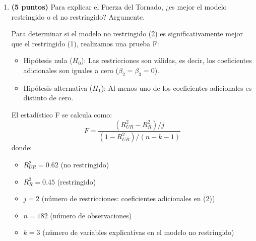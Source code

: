\documentclass[10pt,a4paper]{article}
\begin{document}
\begin{enumerate}
\begin{enumerate}
{    \begin{itemize}
        \item La hipótesis nula (\( H_0 \)) plantea que todos los coeficientes son simultáneamente cero:
        \[
        H_0: \beta_1 = \beta_2 = \beta_3 = 0
        \]
        \item La hipótesis alternativa (\( H_1 \)) es que al menos uno de los coeficientes es distinto de cero.
    \end{itemize}

    El estadístico F del modelo (2) es:
    \[
    F = 96.3, \quad df = (3, 178)
    \]
    El valor crítico de F con \(\alpha=0.01\) y \(df=(3,178)\) es aproximadamente \(3.87\).

    Dado que \( F = 96.3 \) es mucho mayor que el valor crítico, rechazamos la hipótesis nula \( H_0 \) al 1\% de significancia.

    Entonces, el modelo es estadísticamente significativo en su conjunto, lo que indica que al menos una de las variables (\textit{Velocidad del Viento}, \textit{Precipitaciones} o \textit{Temperatura}) tiene un efecto significativo sobre la fuerza del tornado.}

    \item \textbf{(5 puntos)} Para explicar el Fuerza del Tornado, ¿es mejor el modelo restringido o el no restringido? Argumente.\\
{\color{blue}
    Para determinar si el modelo no restringido (2) es significativamente mejor que el restringido (1), realizamos una prueba F:

    \begin{itemize}
        \item Hipótesis nula (\( H_0 \)): Las restricciones son válidas, es decir, los coeficientes adicionales son iguales a cero (\( \beta_2 = \beta_3 = 0 \)).
        \item Hipótesis alternativa (\( H_1 \)): Al menos uno de los coeficientes adicionales es distinto de cero.
    \end{itemize}
    
    El estadístico F se calcula como:
    \[
    F = \frac{(R^2_{UR} - R^2_{R})/j}{(1 - R^2_{UR})/(n - k - 1)}
    \]
    donde:
    \begin{itemize}
        \item \( R^2_{UR} = 0.62 \) (no restringido)
        \item \( R^2_{R} = 0.45 \) (restringido)
        \item \( j = 2 \) (número de restricciones: coeficientes adicionales en (2))
        \item \( n = 182 \) (número de observaciones)
        \item \( k = 3 \) (número de variables explicativas en el modelo no restringido)
    \end{itemize}
    
}
\end{enumerate}
\end{enumerate}
\end{document}
